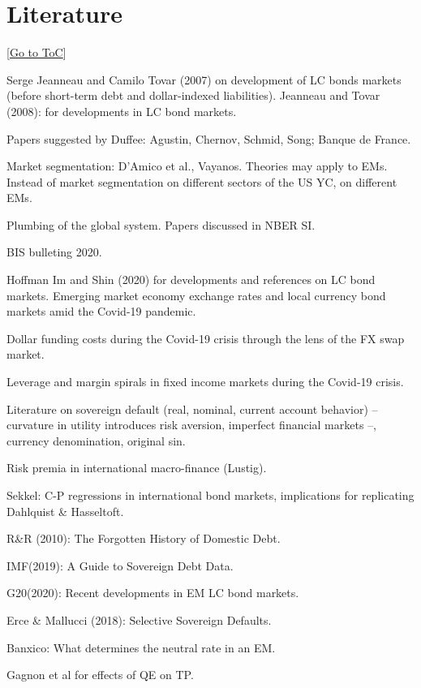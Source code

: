 \documentclass[12pt]{article}
\newcommand{\gototoc}{\vspace{-1.8cm} \null\hfill [\hyperlink{toc}{Go to ToC}] \newline}
\begin{document}
\section{Literature}
\gototoc
\begin{todolist}
	\item Serge Jeanneau and Camilo Tovar (2007) on development of LC bonds markets (before short-term debt and dollar-indexed liabilities). Jeanneau and Tovar (2008): for developments in LC bond markets.
	\item Papers suggested by Duffee: Agustin, Chernov, Schmid, Song; Banque de France.
	\item Market segmentation: D'Amico et al., Vayanos. Theories may apply to EMs. Instead of market segmentation on different sectors of the US YC, on different EMs.
	\item Plumbing of the global system. Papers discussed in NBER SI.
	\item BIS bulleting 2020.
	\begin{todolist}
		\item Hoffman Im and Shin (2020) for developments and references on LC bond markets. Emerging market economy exchange rates and local currency bond markets amid the Covid-19 pandemic.
		\item Dollar funding costs during the Covid-19 crisis through the lens of the FX swap market.
		\item Leverage and margin spirals in fixed income markets during the Covid-19 crisis.
		\item Literature on sovereign default (real, nominal, current account behavior) --curvature in utility introduces risk aversion, imperfect financial markets --, currency denomination, original sin.
		\item Risk premia in international macro-finance (Lustig).
	\end{todolist}
	\item Sekkel: C-P regressions in international bond markets, implications for replicating Dahlquist \& Hasseltoft.
	\item R\&R (2010): The Forgotten History of Domestic Debt.
	\item IMF(2019): A Guide to Sovereign Debt Data.
	\item G20(2020): Recent developments in EM LC bond markets.
	\item Erce \& Mallucci (2018): Selective Sovereign Defaults.
	\item Banxico: What determines the neutral rate in an EM.
	\item Gagnon et al for effects of QE on TP.

\end{todolist}
\end{document}

